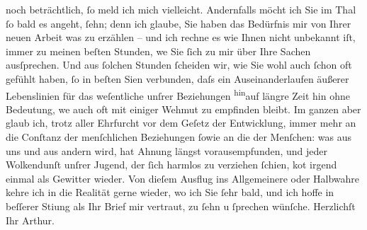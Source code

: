 \begin{ledgroupsized}[t]{13cm}
               noch beträchtlich, ſo meld ich mich vielleicht. Andernfalls möcht ich Sie im Thal ſo
               bald es angeht, ſehn; denn ich glaube, {\pb}Sie haben das
               Bedürfnis mir von Ihrer neuen Arbeit was zu erzählen – und ich rechne es wie Ihnen nicht unbekannt iſt,
               immer zu meinen beſten Stunden, we{\geminationn} Sie ſich zu mir über
               Ihre Sachen ausſprechen. Und aus ſolchen Stunden ſcheiden wir, wie Sie wohl auch
               ſchon oft gefühlt haben, ſo in beſten Si{\geminationn}en verbunden,
               daſs ein Auseinanderlaufen äußerer Lebenslinien für das weſentliche unſrer
               Beziehungen \substVorne{}\textsuperscript{hin}\substDazwischen{}auf\substHinten{} längre Zeit \introOben{}hin\introOben{} ohne Bedeutung, we{\geminationn} auch oft mit einiger Wehmut zu empfinden bleibt. Im
               ganzen aber glaub ich, trotz aller Ehrfurcht vor dem Geſetz der Entwicklung, immer
               mehr an die Conſtanz der \introOben{}menſchlichen\introOben{} Beziehungen \introOben{}ſo\introOben{}wie an die der Menſchen: was aus uns und aus andern wird,
               hat Ahnung längst vorausempfunden, und jeder Wolkendunſt unſrer Jugend, der ſich
               harmlos zu verziehen ſchien, ko{\geminationm}t irgend einmal als
               Gewitter wieder. Von dieſem Ausflug ins Allgemeinere oder Halbwahre kehre ich in die
               Realität gerne wieder, wo ich Sie ſehr bald, und ich hoffe in beſſerer Sti{\geminationm}ung als Ihr Brief mir vertraut, zu ſehn u ſprechen
               wünſche.\pend
           \pstart Herzlichſt Ihr \spacefill\mbox{Arthur.}\pend{}\endnumbering{}\end{ledgroupsized}  \newcommand{\dateiname}{L02168}\newcommand{\titel}{Arthur Schnitzler an Hugo von Hofmannsthal, 28. 3. 1914}\newcommand{\editorInnen}{Martin Anton Müller und Gerd-Hermann Susen}
      